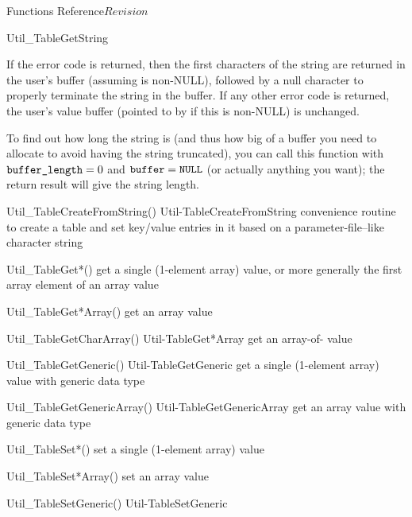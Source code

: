 \begin{cactuspart}{ Functions Reference}{}{$Revision$}
\begin{FunctionDescription}{Util\_TableGetString}
\begin{Discussion}
If the error code  is returned,
then the first  characters of the string are
returned in the user's buffer (assuming  is non-NULL),
followed by a null character to properly terminate the string in the
buffer.  If any other error code is returned, the user's value buffer
(pointed to by  if this is non-NULL) is unchanged.

To find out how long the string is (and thus how big of a buffer you
need to allocate to avoid having the string truncated), you can call
this function with $\mbox{\texttt{buffer\_length}} = 0$ and $\mbox{\texttt{buffer}} = \mbox{\texttt{NULL}}$
(or actually anything you want); the return result will give the
string length.
\end{Discussion}

\begin{SeeAlsoSection}
\begin{SeeAlso2} {Util\_TableCreateFromString()} {Util-TableCreateFromString}
convenience routine to create a table and set key/value entries
in it based on a parameter-file--like character string
\end{SeeAlso2}
\begin{SeeAlso}{Util\_TableGet*()}
get a single (1-element array) value,
or more generally the first array element of an array value
\end{SeeAlso}
\begin{SeeAlso}{Util\_TableGet*Array()}
get an array value
\end{SeeAlso}
\begin{SeeAlso2} {Util\_TableGetCharArray()} {Util-TableGet*Array}
get an array-of- value
\end{SeeAlso2}
\begin{SeeAlso2} {Util\_TableGetGeneric()} {Util-TableGetGeneric}
get a single (1-element array) value with generic data type
\end{SeeAlso2}
\begin{SeeAlso2} {Util\_TableGetGenericArray()} {Util-TableGetGenericArray}
get an array value with generic data type
\end{SeeAlso2}
\begin{SeeAlso}{Util\_TableSet*()}
set a single (1-element array) value
\end{SeeAlso}
\begin{SeeAlso}{Util\_TableSet*Array()}
set an array value
\end{SeeAlso}
\begin{SeeAlso2} {Util\_TableSetGeneric()} {Util-TableSetGeneric}

\end{SeeAlso2}
\end{SeeAlsoSection}
\end{FunctionDescription}
\end{cactuspart}
